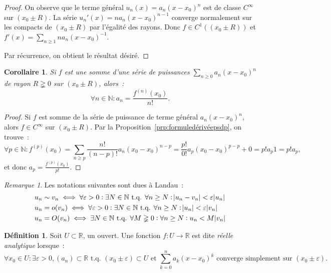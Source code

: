 \documentclass{report}
\newtheorem{cor}[thm]{Corollaire}
\theoremstyle{definition}
\newtheorem{déf}[thm]{Définition}
\theoremstyle{remark}
\newtheorem*{rmq}{Remarque}
\numberwithin{equation}{section}
\newcommand{\R}{\mathbb R}
\newcommand{\N}{\mathbb N}
\newcommand{\tq}{\text{ t.q. }}
\begin{document}
			\begin{proof} On observe que le terme général $u_n(x) = a_n(x-x_0)^n$ est de classe $C^\infty$ sur $(x_0 \pm R)$. La série
			$u_n'(x) = na_n(x-x_0)^{n-1}$ converge normalement sur les compacts de $(x_0 \pm R)$ par l'égalité des rayons. Donc $f \in C^1\left((x_0 \pm R)\right)$
			et $f'(x) = \sum_{n \geq 1}na_n(x-x_0)^{-1}$.

			Par récurrence, on obtient le résultat désiré.
			\end{proof}

			\begin{cor} Si $f$ est une somme d'une série de puissances $\sum_{n \geq 0}a_n(x-x_0)^n$ de rayon $R \gneqq 0$ sur $(x_0 \pm R)$, alors~:
			\begin{equation}
				\forall n \in \N : a_n = \frac {f^{(n)}(x_0)}{n!}.
			\end{equation}
			\end{cor}

			\begin{proof} Si $f$ est somme de la série de puissance de terme général $a_n(x-x_0)^n$, alors $f \in C^\infty$ sur $(x_0 \pm R)$. Par la
			Proposition~\ref{prp:formuledérivéepsdp}, on trouve~:
			\begin{equation}
				\forall p \in \N : f^{(p)}(x_0) = \sum_{n \geq p}\frac {n!}{(n-p)!}a_n(x_0-x_0)^{n-p} = \frac {p!}{0!}a_p(x_0-x_0)^{p-p} + 0 = p!a_p1 = p!a_p,
			\end{equation}
			et donc $a_p = \frac {f^{(p)}(x_0)}{p!}$.
			\end{proof}

			\begin{rmq} Les notations suivantes sont dues à Landau~:
			\begin{align}
				&u_n \sim v_n \iff \forall \varepsilon > 0 : \exists N \in \N \tq \forall n \geq N : \abs {u_n - v_n} < \varepsilon \abs{u_n} \\
				&u_n = o(v_n) \iff \forall \varepsilon > 0 : \exists N \in \N \tq \forall n \geq N : \abs {u_n} < \varepsilon \abs {v_n} \\
				&u_n = O(v_n) \iff \exists N \in \N \tq \forall M \gneqq 0 : \forall n \geq N : u_n < M \abs {v_n}
			\end{align}
			\end{rmq}

			\begin{déf} Soit $U \subset \R$, un ouvert. Une fonction $f : U \to \R$ est dite \textit{réelle analytique} lorsque~:
			\begin{equation}
				\forall x_0 \in U : \exists \varepsilon > 0, (a_n) \subset \R \tq (x_0 \pm \varepsilon) \subset U \text{ et } \sum_{k=0}^na_k(x-x_0)^k
			\text{ converge simplement sur } (x_0 \pm \varepsilon).
			\end{equation}
			\end{déf}
\end{document}
